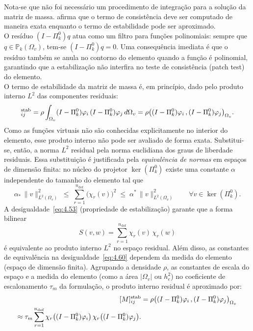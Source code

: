     \indent Nota-se que não foi necessário um procedimento de integração para a solução da matriz de massa. \citet{hitchhikersguidevirtualelementmethod2014a} afirma que o termo de consistência deve ser computado de maneira exata enquanto o termo de estabilidade pode ser aproximado. \\
    \indent O resíduo $(I - \Pi_k^0)q$ atua como um filtro para funções polinomiais: sempre que $q\in\mathbb{P}_k(\Omega_v)$, tem-se $(I - \Pi_k^0)q = 0$. Uma consequência imediata é que o resíduo também se anula no contorno do elemento quando a função é polinomial, garantindo que a estabilização não interfira no teste de consistência (patch test) do elemento.\\
    \indent O termo de estabilidade da matriz de massa é, em princípio, dado pelo produto interno $L^2$ das componentes residuais:
    \begin{equation}
        [M]^{\rm stab}_{ij} =\rho\int_{\Omega_v}(I - \Pi_k^0)\varphi_i\,(I - \Pi_k^0)\varphi_j\,d\Omega_v=\rho\bigl((I - \Pi_k^0)\varphi_i\,,(I - \Pi_k^0)\varphi_j\bigr)_{\Omega_v}.
        \label{eq:4.59}
    \end{equation}
    \indent Como as funções virtuais não são conhecidas explicitamente no interior do elemento, esse produto interno não pode ser avaliado de forma exata. Substitui-se, então, a norma $L^2$ residual pela norma euclidiana dos graus de liberdade residuais. Essa substituição é justificada pela \emph{equivalência de normas} em espaços de dimensão finita: no núcleo do projetor $\ker(\Pi_k^0)$ existe uma constante $\alpha$ independente do tamanho do elemento tal que
    \begin{equation}
        \alpha_*\,\|v\|_{L^2(\Omega_v)}^2 \;\le\; \sum_{r=1}^{n_{\mathrm{dof}}}\bigl(\chi_r(v)\bigr)^2 \;\le\; \alpha^*\,\|v\|_{L^2(\Omega_v)}^2 \qquad \forall v\in\ker(\Pi_k^0).
        \label{eq:4.60}
    \end{equation}
    \indent A desigualdade~\eqref{eq:4.53} (propriedade de estabilização) garante que a forma bilinear 
    \begin{equation*}
        S(v,w)=\sum_{r=1}^{n_{\mathrm{dof}}}\chi_r(v)\,\chi_r(w)
    \end{equation*} 
    \noindent é equivalente ao produto interno $L^2$ no espaço residual. Além disso, as constantes de equivalência na desigualdade~\eqref{eq:4.60} dependem da medida do elemento (espaço de dimensão finita). Agrupando a densidade $\rho$, as constantes de escala do espaço e a medida do elemento (como a área $|\Omega_v|$ ou $h_e^2$) no coeficiente de escalonamento $\tau_m$ da formulação, o produto interno residual é aproximado por:
    \begin{equation}
        \begin{aligned}
        [M]^{\rm stab}_{ij}&=\rho\bigl((I - \Pi_k^0)\varphi_i\,,(I - \Pi_k^0)\varphi_j\bigr)_{\Omega_v}\\ 
        \approx\tau_m\sum_{r=1}^{n_{\mathrm{dof}}}\chi_r\bigl((I - \Pi_k^0)\varphi_i\bigr)\,\chi_r\bigl((I - \Pi_k^0)\varphi_j\bigr).
    \end{aligned}
    \end{equation}


